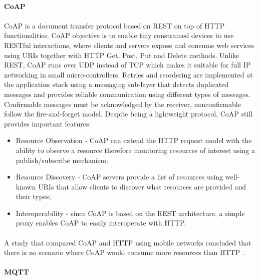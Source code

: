 \paragraph{\textbf{\ac{CoAP}}}
\paragraph{}
	\ac{CoAP} \cite{Shelby2014} is a document transfer protocol based on \ac{REST} on top of \ac{HTTP} functionalities. \ac{CoAP} objective is to enable tiny constrained devices to use RESTful interactions, where clients and servers expose and consume web services using \ac{URIs} together with  \ac{HTTP} Get, Post, Put and Delete methods. Unlike \ac{REST}, \ac{CoAP} runs over \ac{UDP} instead of \ac{TCP} which makes it suitable for full IP networking in small micro-controllers. Retries and reordering are implemented at the application stack using a messaging sub-layer that detects duplicated messages and provides reliable communication using different types of messages. Confirmable messages must be acknowledged by the receiver, nonconfirmable follow the fire-and-forget model. Despite being a lightweight protocol, \ac{CoAP} still provides important features:
	
\begin{itemize}
	\item Resource Observation - \ac{CoAP} can extend the \ac{HTTP} request model with the ability to observe a resource therefore monitoring resources of interest using a publish/subscribe mechanism;\\
	\item Resource Discovery - \ac{CoAP} servers provide a list of resources using well-known {URIs} that allow clients to discover what resources are provided and their types;\\
	\item Interoperability - since \ac{CoAP} is based on the \ac{REST} architecture, a simple proxy enables \ac{CoAP} to easily interoperate with \ac{HTTP}.
\end{itemize}

\paragraph{}
A study that compared \ac{CoAP} and \ac{HTTP} using mobile networks concluded that there is no scenario where \ac{CoAP} would consume more resources than \ac{HTTP} \cite{Savolainen2014}.

\paragraph{\textbf{\ac{MQTT}}}
